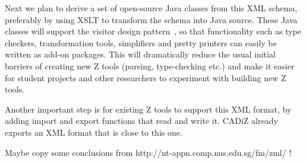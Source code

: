 \documentclass{llncs}  %
\newcommand{\CADiZ}{CADiZ}
\begin{document}
Next we plan to derive a set of open-source Java classes from this XML
schema, preferably by using XSLT to transform the schema into Java source.
These Java classes will support the visitor design
pattern~\cite{Patterns???}, so that functionality such as type checkers,
transformation tools, simplifiers and pretty printers can easily be written
as add-on packages.  This will dramatically reduce the usual initial
barriers of creating new Z tools (parsing, type-checking etc.) and make it
easier for student projects and other researchers to experiment with
building new Z tools.

Another important step is for existing Z tools to support this
XML format, by adding import and export functions that read and write it.
{\CADiZ} already exports an XML format that is close to this one.

Maybe copy some conclusions from http://nt-appn.comp.nus.edu.sg/fm/zml/ !



\end{document}
